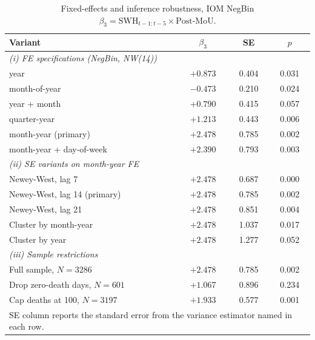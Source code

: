 \begin{table}[h!]
\centering
\small
\caption{Fixed-effects and inference robustness, IOM NegBin
$\beta_3=\mathrm{SWH}_{t-1:t-5}\times\mathrm{Post\text{-}MoU}$.}
\label{tab:appx-fe}
\begin{tabular}{lccc}
\hline
Variant & $\beta_3$ & SE & $p$ \\
\hline
\multicolumn{4}{l}{\textit{(i) FE specifications (NegBin, NW(14))}} \\
year                       & $+0.873$  & 0.404 & 0.031 \\
month-of-year              & $-0.473$  & 0.210 & 0.024 \\
year + month               & $+0.790$  & 0.415 & 0.057 \\
quarter-year               & $+1.213$  & 0.443 & 0.006 \\
month-year (primary)       & $+2.478$  & 0.785 & 0.002 \\
month-year + day-of-week   & $+2.390$  & 0.793 & 0.003 \\
\multicolumn{4}{l}{\textit{(ii) SE variants on month-year FE}} \\
Newey-West, lag 7          & $+2.478$  & 0.687 & 0.000 \\
Newey-West, lag 14 (primary) & $+2.478$  & 0.785 & 0.002 \\
Newey-West, lag 21         & $+2.478$  & 0.851 & 0.004 \\
Cluster by month-year      & $+2.478$  & 1.037 & 0.017 \\
Cluster by year            & $+2.478$  & 1.277 & 0.052 \\
\multicolumn{4}{l}{\textit{(iii) Sample restrictions}} \\
Full sample, $N=3286$  & $+2.478$  & 0.785 & 0.002 \\
Drop zero-death days, $N=601$  & $+1.067$  & 0.896 & 0.234 \\
Cap deaths at 100, $N=3197$  & $+1.933$  & 0.577 & 0.001 \\
\hline
\multicolumn{4}{l}{\footnotesize SE column reports the standard error from the variance estimator named in each row.}
\end{tabular}
\end{table}
